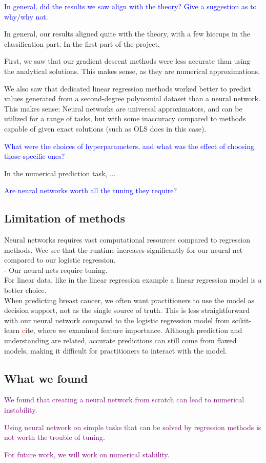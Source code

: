 \textcolor{blue}{In general, did the results we saw align with the theory? Give a suggestion as to why/why not.}

In general, our results aligned quite with the theory, with a few hiccups in the classification part. In the first part of the project, 

First, we saw that our gradient descent methods were less accurate than using the analytical solutions. This makes sense, as they are numerical approximations. 

We also saw that dedicated linear regression methods worked better to predict values generated from a second-degree polynomial dataset than a neural network. This makes sense: Neural networks are universal approximators, and can be utilized for a range of tasks, but with some inaccuracy compared to methods capable of given exact solutions (such as OLS does in this case). 

\textcolor{blue}{What were the choices of hyperparameters, and what was the effect of choosing those specific ones?}

In the numerical prediction task, ...

\textcolor{blue}{Are neural networks worth all the tuning they require?}

\subsection{Limitation of methods}
Neural networks requires vast computational resources compared to regression methods. Wee see that the runtime increases significantly for our neural net compared to our logistic regression. \\

-  Our neural nets require tuning. \\

For linear data, like in the linear regression example
a linear regression model is a better choice. 
\\
When predicting breast cancer, we often want practitioners to use the model as decision support, not as the single source of truth. This is less straightforward with our neural network compared to the logistic regression model from scikit-learn \textcolor{red} cite, where we examined feature importance. Although prediction and understanding are related, accurate predictions can still come from flawed models, making it difficult for practitioners to interact with the model.
\subsection{What we found}

\textcolor{purple}{We found that creating a neural network from scratch can lead to numerical instability. }

\textcolor{purple}{Using neural network on simple tasks that can be solved by regression methods is not worth the trouble of tuning.}

\textcolor{purple}{For future work, we will work on numerical stability. }
